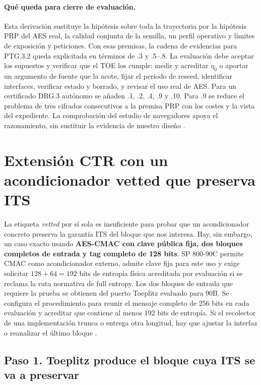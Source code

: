 \documentclass[11pt,a4paper]{article}
\begin{document}
\paragraph{Qué queda para cierre de evaluación.}
Esta derivación sustituye la hipótesis
sobre toda la trayectoria por la
hipótesis PRP del AES real, la
calidad conjunta de la semilla,
un perfil operativo y límites de
exposición y peticiones. Con esas
premisas, la cadena de evidencias
para PTG.3.2 queda explicitada
en términos de .3 y .5--.8.
La evaluación debe aceptar los
supuestos y verificar que el TOE
los cumple: medir y acreditar
\(\eta_0\) o aportar un argumento
de fuente que la acote, fijar el
periodo de reseed, identificar
interfaces, verificar estado y
borrado, y revisar el uso real de AES.
Para un certificado DRG.3 autónomo
se añaden .1, .2, .4, .9 y .10.
Para .9 se reduce el problema de tres cifrados consecutivos a la premisa PRP con los costes y la vista del expediente.
La comprobación
del estudio de navegadores apoya
el razonamiento, sin sustituir la
evidencia de nuestro diseño
\cite[§§99--102, 207, 380 y 1007]{ais}\cite[§§3.2.4.3 y 4.2.4.3]{bsi-browsers}.




\section{Extensión CTR con un acondicionador vetted que preserva ITS}
\label{sec:cmac-ctr}

La etiqueta \emph{vetted} por sí sola es insuficiente para probar
que un acondicionador concreto preserva la garantía ITS del
bloque que nos interesa. Hay, sin embargo, un caso exacto usando
\textbf{AES-CMAC con clave pública fija, dos bloques completos
de entrada y tag completo de 128 bits}. SP 800-90C permite
CMAC como acondicionador externo, admite clave fija para este
uso y exige solicitar \(128+64=192\) bits de entropía física
acreditada por evaluación si se reclama la ruta normativa de
full entropy. Los dos bloques de entrada que requiere la
prueba se obtienen del puerto Toeplitz evaluado para 90B.
Se configura el procedimiento para reunir el mensaje completo
de 256 bits en cada evaluación y acreditar que contiene
al menos 192 bits de entropía. Si el recolector de una
implementación trunca o entrega otra longitud, hay que
ajustar la interfaz o reanalizar el último bloque
\cite[§§3.1, 3.2.1.1, 3.2.1.3 y 3.2.2.2]{nist90c}\cite[§6.2]{cmac}.

\subsection{Paso 1. Toeplitz produce el bloque cuya ITS se va a preservar}
\end{document}
